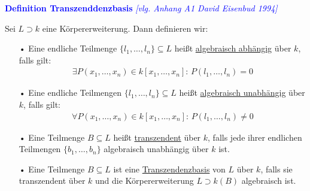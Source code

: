 \documentclass[10pt,a4paper]{report}
\newcommand{\comment}[1]{}
\newcommand{\ModulsOfDifferenzials}{David Eisenbud 1994}
\begin{document}
\textcolor{blue}{\textbf{Definition Transzenddenzbasis} \textit{[vlg. Anhang A1 \ModulsOfDifferenzials]}}
\begin{def}\comment{\label{Definition Transzenddenzbasis}}
Sei $L \supset k$ eine Körpererweiterung. Dann definieren wir:
\begin{itemize}
\item[•] Eine endliche Teilmenge $\lbrace l_1, \dots ,l_n \rbrace \subseteq L$ heißt \underline{algebraisch abhängig} über $k$, falls gilt:
\begin{gather*}
\exists P(x_1, \dots , x_n) \in k[x_1,\dots,x_n] : \, P(l_1, \dots , l_n) = 0
\end{gather*}
\item[•] Eine endliche Teilmengen $\lbrace l_1, \dots ,l_n \rbrace \subseteq L$ heißt \underline{algebraisch unabhängig} über $k$, falls gilt:
\begin{gather*}
\forall P(x_1, \dots , x_n) \in k[x_1,\dots,x_n] : \, P(l_1, \dots , l_n) \neq 0
\end{gather*}
\item[•] Eine Teilmenge $B \subseteq L$ heißt \underline{transzendent} über $k$, falls jede ihrer endlichen Teilmengen $\lbrace b_1, \dots , b_n \rbrace$ algebraisch unabhängig über $k$ ist.
\item[•] Eine Teilmenge $B \subseteq L$ ist eine \underline{Transzendenzbasis} von $L$ über $k$, falls sie transzendent über $k$ und die Körpererweiterung $L \supset k(B)$ algebraisch ist. 
\end{itemize}
\end{def}
\end{document}
